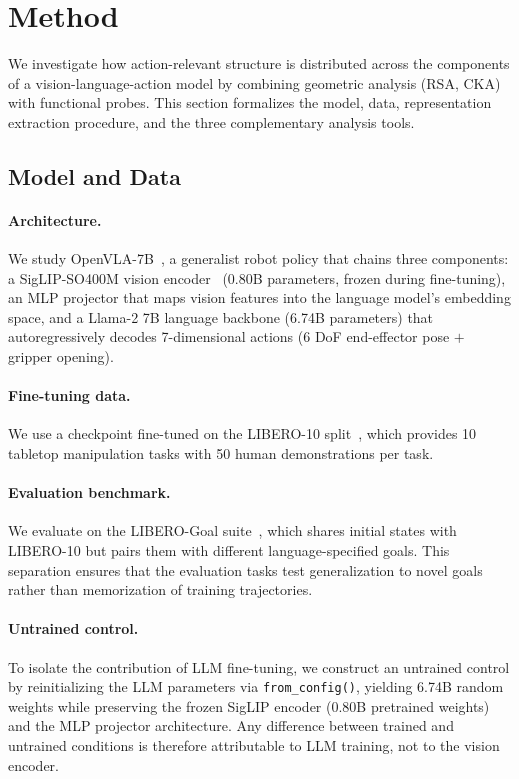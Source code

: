 \section{Method}
\label{sec:method}

We investigate how action-relevant structure is distributed across the components of a vision-language-action model by combining geometric analysis (RSA, CKA) with functional probes.
This section formalizes the model, data, representation extraction procedure, and the three complementary analysis tools.

\subsection{Model and Data}
\label{sec:model_data}

\paragraph{Architecture.}
We study OpenVLA-7B~\cite{kim2024_openvla,karamcheti2024}, a generalist robot policy that chains three components: a SigLIP-SO400M vision encoder~\cite{zhai2023_siglip} (0.80B parameters, frozen during fine-tuning), an MLP projector that maps vision features into the language model's embedding space, and a Llama-2 7B language backbone (6.74B parameters) that autoregressively decodes 7-dimensional actions (6 DoF end-effector pose $+$ gripper opening).

\paragraph{Fine-tuning data.}
We use a checkpoint fine-tuned on the LIBERO-10 split~\cite{liu2023_libero}, which provides 10 tabletop manipulation tasks with 50 human demonstrations per task.

\paragraph{Evaluation benchmark.}
We evaluate on the LIBERO-Goal suite~\cite{liu2023_libero}, which shares initial states with LIBERO-10 but pairs them with different language-specified goals.
This separation ensures that the evaluation tasks test generalization to novel goals rather than memorization of training trajectories.

\paragraph{Untrained control.}
To isolate the contribution of LLM fine-tuning, we construct an untrained control by reinitializing the LLM parameters via \texttt{from\_config()}, yielding 6.74B random weights while preserving the frozen SigLIP encoder (0.80B pretrained weights) and the MLP projector architecture.
Any difference between trained and untrained conditions is therefore attributable to LLM training, not to the vision encoder.

